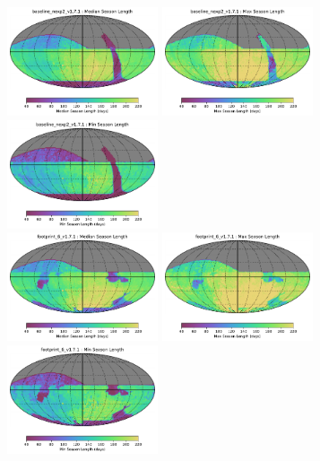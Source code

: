 \documentclass[modern]{aastex62}
\begin{document}
\begin{figure}
\includegraphics[width=1.75in]{plots/seasons/baseline_nexp2_v1_7_1_Median_Season_Length_HEAL_SkyMap.pdf}
\includegraphics[width=1.75in]{plots/seasons/baseline_nexp2_v1_7_1_Max_Season_Length_HEAL_SkyMap.pdf}
\includegraphics[width=1.75in]{plots/seasons/baseline_nexp2_v1_7_1_Min_Season_Length_HEAL_SkyMap.pdf} \\
\includegraphics[width=1.75in]{plots/seasons/footprint_6_v1_7_1_Median_Season_Length_HEAL_SkyMap.pdf}
\includegraphics[width=1.75in]{plots/seasons/footprint_6_v1_7_1_Max_Season_Length_HEAL_SkyMap.pdf}
\includegraphics[width=1.75in]{plots/seasons/footprint_6_v1_7_1_Min_Season_Length_HEAL_SkyMap.pdf} \\

\end{figure}
\end{document}
